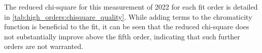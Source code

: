 

The reduced chi-square for this measurement of 2022 for each fit order is detailed in
\cref{tab:high_orders:chisquare_quality}. While adding terms to the chromaticity function is
beneficial to the fit, it can be seen that the reduced chi-square does not substantially improve 
above the fifth order, indicating that such further orders are not warranted.

